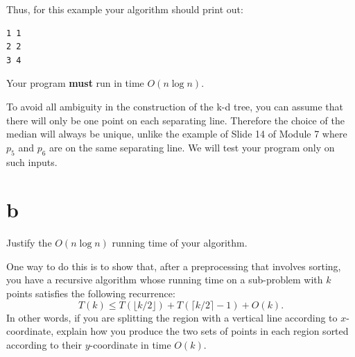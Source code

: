 \documentclass[12pt]{article}
\begin{document}
\begin{enumerate}
Thus, for this example your algorithm should print out:
\begin{verbatim}
1 1
2 2
3 4
\end{verbatim}
Your program {\bf must} run in time $O(n \log n)$.

To avoid all ambiguity in the construction of the k-d tree, you can assume that
there will only be one point on each separating line.
Therefore the choice of the median will always be unique,
unlike the example of Slide 14 of Module 7 where $p_5$ and $p_6$ are on the same separating line.
We will test your program only on such inputs.

\part{b} Justify the $O(n \log n)$ running time of your algorithm.

One way to do this is to show that, after a preprocessing that involves sorting,
you have a recursive algorithm whose running time on a sub-problem with $k$ points
satisfies the following recurrence:
$$T(k) \leq T(\lfloor k/2\rfloor) + T(\lceil k/2 \rceil-1)+ O(k).$$
In other words, if you are splitting the region with a
vertical line according to $x$-coordinate,
explain how you produce the two sets of points in each
region sorted according to their $y$-coordinate in time $O(k)$.
\end{enumerate}

\end{document}
